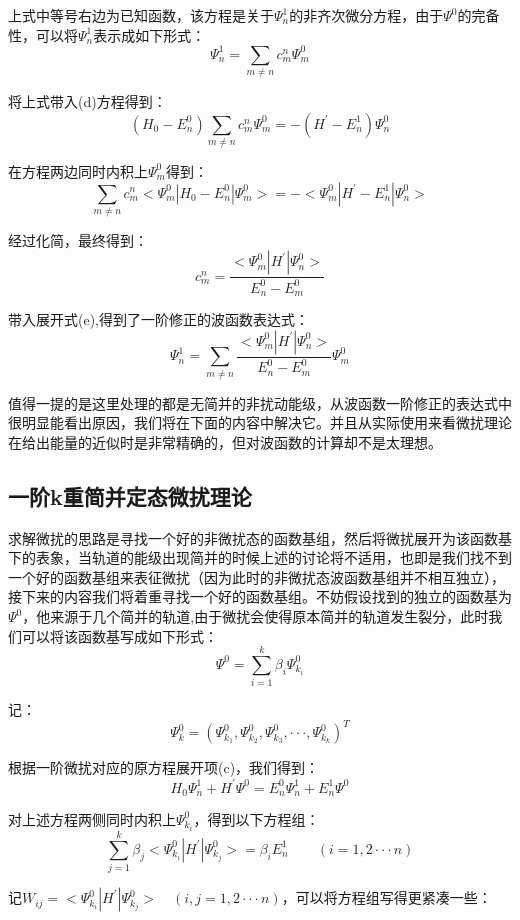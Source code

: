 上式中等号右边为已知函数，该方程是关于$\varPsi_n^1$的非齐次微分方程，由于$\varPsi^0$的完备性，可以将$\varPsi_n^1$表示成如下形式：
\[\varPsi_n^1=\sum_{m \neq n}c_m^n\varPsi_m^0 \tag{e}\]

将上式带入(d)方程得到：
\[(H_0-E_n^0) \sum_{m \neq n}c_m^n\varPsi_m^0=-(H^{'}-E_n^1) \varPsi_n^0\]

在方程两边同时内积上$\varPsi_m^0$得到：
\[\sum_{m \neq n} c_m^n<\varPsi_m^0|H_0-E_n^0|\varPsi_m^0>=-<\varPsi_m^0|H^{'}-E_n^1|\varPsi_n^0>\]

经过化简，最终得到：
\[c_m^n=\frac{<\varPsi_m^0|H^{'}|\varPsi_n^0>}{E_n^0-E_m^0}\]

带入展开式(e),得到了一阶修正的波函数表达式：
\[\varPsi_n^1=\sum_{m \neq n}\frac{<\varPsi_m^0|H^{'}|\varPsi_n^0>}{E_n^0-E_m^0}\varPsi_m^0\]

值得一提的是这里处理的都是无简并的非扰动能级，从波函数一阶修正的表达式中很明显能看出原因，我们将在下面的内容中解决它。并且从实际使用来看微扰理论在给出能量的近似时是非常精确的，但对波函数的计算却不是太理想。

\subsection{一阶k重简并定态微扰理论}
求解微扰的思路是寻找一个好的非微扰态的函数基组，然后将微扰展开为该函数基下的表象，当轨道的能级出现简并的时候上述的讨论将不适用，也即是我们找不到一个好的函数基组来表征微扰（因为此时的非微扰态波函数基组并不相互独立），接下来的内容我们将着重寻找一个好的函数基组。不妨假设找到的独立的函数基为$\varPsi^0$，他来源于几个简并的轨道,由于微扰会使得原本简并的轨道发生裂分，此时我们可以将该函数基写成如下形式：
\[\varPsi^0=\sum_{i=1}^k\beta_i\varPsi_{k_i}^0\]

记：
\[\varPsi_k^0=\left (\varPsi_{k_1}^0 , \varPsi_{k_2}^0 ,\varPsi_{k_3}^0, \cdot \cdot \cdot , \varPsi_{k_k}^0\right )^T\]

根据一阶微扰对应的原方程展开项(c)，我们得到：
\[H_0 \varPsi_n^1+H^{'} \varPsi^0=E_n^0 \varPsi_n^1+E_n^1 \varPsi^0\]

对上述方程两侧同时内积上$\varPsi_{k_i}^0$，得到以下方程组：
\[\sum_{j=1}^k\beta_j<\varPsi_{k_i}^0|H^{'}|\varPsi_{k_j}^0>=\beta_i E_n^1 \qquad (i=1,2 \cdot\cdot\cdot n)\]

记$W_{ij}=<\varPsi_{k_i}^0|H^{'}|\varPsi_{k_j}^0> \quad (i,j=1,2 \cdot\cdot\cdot n)$，可以将方程组写得更紧凑一些：

